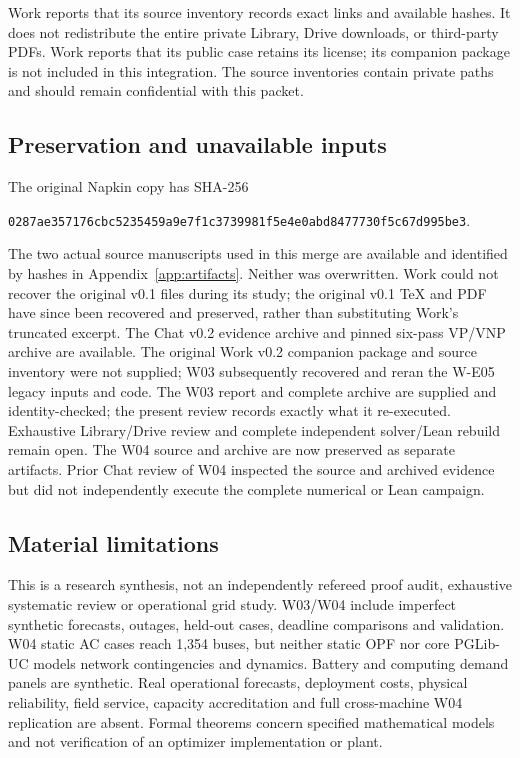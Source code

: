 \documentclass[11pt,letterpaper]{article}
\begin{document}
Work reports that its source inventory records exact links and available hashes. It does not redistribute the entire private Library, Drive downloads, or third-party PDFs. Work reports that its public case retains its license; its companion package is not included in this integration. The source inventories contain private paths and should remain confidential with this packet.

\subsection{Preservation and unavailable inputs}
The original Napkin copy has SHA-256\par\texttt{0287ae357176cbc5235459a9e7f1c37399}\newline\texttt{81f5e4e0abd8477730f5c67d995be3}.\par The two actual source manuscripts used in this merge are available and identified by hashes in Appendix~\ref{app:artifacts}. Neither was overwritten. Work could not recover the original v0.1 files during its study; the original v0.1 TeX and PDF have since been recovered and preserved, rather than substituting Work's truncated excerpt. The Chat v0.2 evidence archive and pinned six-pass VP/VNP archive are available. The original Work v0.2 companion package and source inventory were not supplied; W03 subsequently recovered and reran the W-E05 legacy inputs and code. The W03 report and complete archive are supplied and identity-checked; the present review records exactly what it re-executed. Exhaustive Library/Drive review and complete independent solver/Lean rebuild remain open. The W04 source and archive are now preserved as separate artifacts. Prior Chat review of W04 inspected the source and archived evidence but did not independently execute the complete numerical or Lean campaign.

\subsection{Material limitations}
This is a research synthesis, not an independently refereed proof audit, exhaustive systematic review or operational grid study. W03/W04 include imperfect synthetic forecasts, outages, held-out cases, deadline comparisons and validation. W04 static AC cases reach 1,354 buses, but neither static OPF nor core PGLib-UC models network contingencies and dynamics. Battery and computing demand panels are synthetic. Real operational forecasts, deployment costs, physical reliability, field service, capacity accreditation and full cross-machine W04 replication are absent. Formal theorems concern specified mathematical models and not verification of an optimizer implementation or plant.
\end{document}
